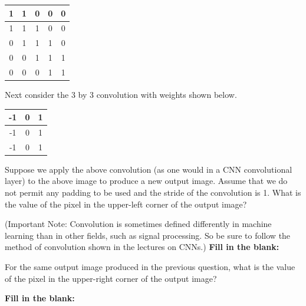 \documentclass[11pt,addpoints,answers]{exam}
\begin{document}
\begin{questions}
    \begin{center}
    \begin{tabular}{|c|c|c|c|c|}
    \hline
    1 & 1 & 0 & 0 & 0    \\ \hline
    1 & 1 & 1 & 0 & 0    \\ \hline
    0 & 1 & 1 & 1 & 0     \\ \hline
    0 & 0 & 1 & 1 & 1     \\ \hline
    0 & 0 & 0 & 1 & 1     \\ \hline
    \end{tabular}
    \end{center}
    
    Next consider the 3 by 3 convolution with weights shown below.

    \begin{center}
    \begin{tabular}{|c|c|c|}
    \hline
    -1 & 0 & 1    \\ \hline
    -1 & 0 & 1    \\ \hline
    -1 & 0 & 1     \\ \hline
    \end{tabular}
    \end{center}

    Suppose we apply the above convolution (as one would in a CNN convolutional layer) to the above image to produce a new output image. Assume that we do not permit any padding to be used and the stride of the convolution is 1. What is the value of the pixel in the upper-left corner of the output image?
    
    
    (Important Note: Convolution is sometimes defined differently in machine learning than in other fields, such as signal processing. So be sure to follow the method of convolution shown in the lectures on CNNs.) \textbf{Fill in the blank:}
    
    \begin{your_solution}[height=2cm, width=4cm]
    \end{your_solution}
    
    
    
    \question[2] For the same output image produced in the previous question, what is the value of the pixel in the upper-right corner of the output image?
    
        \textbf{Fill in the blank:}
    
    \begin{your_solution}[height=2cm, width=4cm]
    \end{your_solution}
    

\end{questions}
\end{document}
